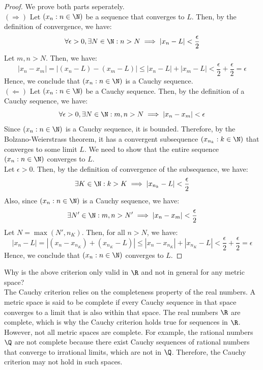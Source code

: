 \documentclass[openany]{book}
\begin{document}
\begin{proof}
    We prove both parts seperately. \\
    $(\Rightarrow)$ Let $(x_n : n \in \N)$ be a sequence that converges to $L$. Then, by the definition of convergence, we have:
    $$\forall \epsilon > 0, \exists N \in \N: n > N \implies |x_n - L| < \frac{\epsilon}{2}$$
    Let $m,n > N$. Then, we have:
    $$|x_n - x_m| = |(x_n - L) - (x_m - L)| \leq |x_n - L| + |x_m - L| < \frac{\epsilon}{2} + \frac{\epsilon}{2} = \epsilon$$
    Hence, we conclude that $(x_n : n \in \N)$ is a Cauchy sequence. \\
    $(\Leftarrow)$ Let $(x_n : n \in \N)$ be a Cauchy sequence. Then, by the definition of a Cauchy sequence, we have:
    $$\forall \epsilon > 0, \exists N \in \N: m,n > N \implies |x_n - x_m| < \epsilon$$
    Since $(x_n : n \in \N)$ is a Cauchy sequence, it is bounded. Therefore, by the Bolzano-Weierstrass theorem, it has a convergent subsequence $(x_{n_k} : k \in \N)$ that converges to some limit $L$. We need to show that the entire sequence $(x_n : n \in \N)$ converges to $L$. \\
    Let $\epsilon > 0$. Then, by the definition of convergence of the subsequence, we have:
    $$\exists K \in \N: k > K \implies |x_{n_k} - L| < \frac{\epsilon}{2}$$
    Also, since $(x_n : n \in \N)$ is a Cauchy sequence, we have:
    $$\exists N' \in \N: m,n > N' \implies |x_n - x_m| < \frac{\epsilon}{2}$$
    Let $N = \max(N', n_K)$. Then, for all $n > N$, we have:
    $$|x_n - L| = |(x_n - x_{n_K}) + (x_{n_K} - L)| \leq |x_n - x_{n_K}| + |x_{n_K} - L| < \frac{\epsilon}{2} + \frac{\epsilon}{2} = \epsilon$$
    Hence, we conclude that $(x_n : n \in \N)$ converges to $L$.
\end{proof}
\begin{mynote}
Why is the above criterion only valid in $\R$ and not in general for any metric space? \\
    The Cauchy criterion relies on the completeness property of the real numbers. A metric space is said to be complete if every Cauchy sequence in that space converges to a limit that is also within that space. The real numbers $\R$ are complete, which is why the Cauchy criterion holds true for sequences in $\R$. However, not all metric spaces are complete. For example, the rational numbers $\Q$ are not complete because there exist Cauchy sequences of rational numbers that converge to irrational limits, which are not in $\Q$. Therefore, the Cauchy criterion may not hold in such spaces.
\end{mynote}
\end{document}
